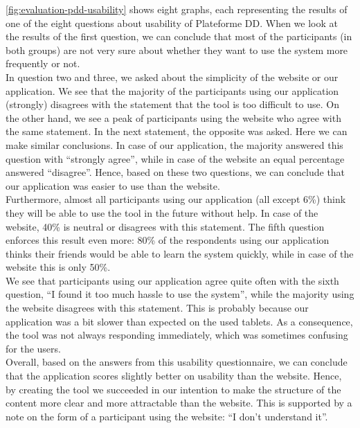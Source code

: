 \autoref{fig:evaluation-pdd-usability} shows eight graphs, each representing the results of one of the eight questions about usability of Plateforme DD. When we look at the results of the first question, we can conclude that most of the participants (in both groups) are not very sure about whether they want to use the system more frequently or not.\\

In question two and three, we asked about the simplicity of the website or our application. We see that the majority of the participants using our application (strongly) disagrees with the statement that the tool is too difficult to use. On the other hand, we see a peak of participants using the website who agree with the same statement. In the next statement, the opposite was asked. Here we can make similar conclusions. In case of our application, the majority answered this question with ``strongly agree'', while in case of the website an equal percentage answered ``disagree''. Hence, based on these two questions, we can conclude that our application was easier to use than the website.\\

Furthermore, almost all participants using our application (all except 6\%) think they will be able to use the tool in the future without help. In case of the website, 40\% is neutral or disagrees with this statement. The fifth question enforces this result even more: 80\% of the respondents using our application thinks their friends would be able to learn the system quickly, while in case of the website this is only 50\%.\\

We see that participants using our application agree quite often with the sixth question, ``I found it too much hassle to use the system'', while the majority using the website disagrees with this statement. This is probably because our application was a bit slower than expected on the used tablets. As a consequence, the tool was not always responding immediately, which was sometimes confusing for the users.\\

Overall, based on the answers from this usability questionnaire, we can conclude that the application scores slightly better on usability than the website. Hence, by creating the tool we succeeded in our intention to make the structure of the content more clear and more attractable than the website. This is supported by a note on the form of a participant using the website: ``I don't understand it''.


